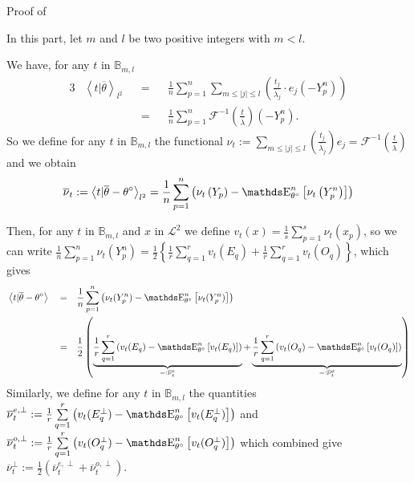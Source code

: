 \begin{pro}{Proof of \\}\label{PROD.5.3}

In this part, let $m$ and $l$ be two positive integers with $m < l$.

We have, for any $t$ in $\mathds{B}_{m, l}$
\begin{alignat*}{3}
&\left\langle t \vert \overline{\theta} \right\rangle_{l^{2}} && = && \frac{1}{n} \sum\limits_{p = 1}^{n} \sum\limits_{m \leq \vert j \vert \leq l} \left(\frac{t_{j}}{\overline{\lambda}_{j}} \cdot e_{j}\left(- Y_{p}^{n}\right)\right)\\
& && = && \frac{1}{n} \sum\limits_{p = 1}^{n} \mathcal{F}^{-1}\left(\frac{t}{\overline{\lambda}}\right)\left(- Y_{p}^{n}\right).
\end{alignat*}
So we define for any $t$ in $\mathds{B}_{m, l}$ the functional $\nu_{t} := \sum\limits_{m \leq \vert j \vert \leq l} \left(\frac{t_{j}}{\overline{\lambda}_{j}}\right) e_{j} = \mathcal{F}^{-1}\left(\frac{t}{\overline{\lambda}}\right)$ and we obtain
\[\overline{\nu}_{t} := \left\langle t \vert \overline{\theta} - \theta^{\circ} \right\rangle_{l^{2}} = \frac{1}{n} \sum\limits_{p = 1}^{n} \left(\nu_{t}\left(Y_{p}\right) - \E_{\theta^{\circ}}^{n}\left[\nu_{t}\left(Y_{p}^{n}\right)\right]\right)\]

\medskip

Then, for any $t$ in $\mathds{B}_{m, l}$ and $x$ in $\mathcal{L}^{2}$ we define $v_{t}(x) = \frac{1}{s} \sum\limits_{p = 1}^{s} \nu_{t}(x_{p})$, so we can write $\frac{1}{n} \sum\limits_{p = 1}^{n} \nu_{t}(Y_{p}^{n}) = \frac{1}{2} \left\{ \frac{1}{r} \sum\limits_{q = 1}^{r} v_{t}(E_{q}) + \frac{1}{r} \sum\limits_{q = 1}^{r} v_{t}(O_{q}) \right\}$, which gives
\begin{alignat*}{3}
& \left\langle t \vert \overline{\theta} - \theta^{\circ}\right\rangle && = && \frac{1}{n} \sum\limits_{p = 1}^{n} \left(\nu_{t}(Y_{p}^{n}) - \E_{\theta^{\circ}}^{n}\left[\nu_{t}(Y_{p}^{n})\right]\right)\\
& && = && \frac{1}{2} \left(\underbrace{\frac{1}{r} \sum\limits_{q = 1}^{r} \left(v_{t}(E_{q})- \E_{\theta^{\circ}}^{n}\left[v_{t}(E_{q})\right]\right)}_{=: \overline{\nu}_{t}^{e}} + \underbrace{\frac{1}{r} \sum\limits_{q = 1}^{r} \left(v_{t}(O_{q})- \E_{\theta^{\circ}}^{n}\left[v_{t}(O_{q})\right]\right)}_{=: \overline{\nu}_{t}^{o}}\right)
\end{alignat*}
Similarly, we define for any $t$ in $\mathds{B}_{m, l}$ the quantities $\overline{\nu}_{t}^{e, \perp} := \frac{1}{r} \sum\limits_{q = 1}^{r} \left(v_{t}(E_{q}^{\perp})- \E_{\theta^{\circ}}^{n}\left[v_{t}(E_{q}^{\perp})\right]\right)$ and $\overline{\nu}_{t}^{o, \perp} := \frac{1}{r} \sum\limits_{q = 1}^{r} \left(v_{t}(O_{q}^{\perp})- \E_{\theta^{\circ}}^{n}\left[v_{t}(O_{q}^{\perp})\right]\right)$ which combined give $\overline{\nu}_{t}^{\perp} := \frac{1}{2} \left(\overline{\nu}_{t}^{e, \perp} + \overline{\nu}_{t}^{o, \perp}\right)$.



\end{pro}
